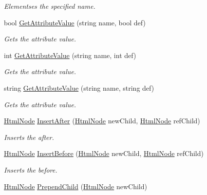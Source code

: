 \begin{DoxyCompactItemize}
\begin{DoxyCompactList}\small\item\em Elementses the specified name. \end{DoxyCompactList}\item 
bool \hyperlink{class_html_agility_pack_1_1_html_node_a7c92c891c52dc9e5439ab7aa03a455b0}{Get\+Attribute\+Value} (string name, bool def)
\begin{DoxyCompactList}\small\item\em Gets the attribute value. \end{DoxyCompactList}\item 
int \hyperlink{class_html_agility_pack_1_1_html_node_a867a87ed04bc299e6ebd9012ec32b1f0}{Get\+Attribute\+Value} (string name, int def)
\begin{DoxyCompactList}\small\item\em Gets the attribute value. \end{DoxyCompactList}\item 
string \hyperlink{class_html_agility_pack_1_1_html_node_aba043cb93effaa267479336fbc68d446}{Get\+Attribute\+Value} (string name, string def)
\begin{DoxyCompactList}\small\item\em Gets the attribute value. \end{DoxyCompactList}\item 
\hyperlink{class_html_agility_pack_1_1_html_node}{Html\+Node} \hyperlink{class_html_agility_pack_1_1_html_node_ac81201c1243724141548c7981a70fb56}{Insert\+After} (\hyperlink{class_html_agility_pack_1_1_html_node}{Html\+Node} new\+Child, \hyperlink{class_html_agility_pack_1_1_html_node}{Html\+Node} ref\+Child)
\begin{DoxyCompactList}\small\item\em Inserts the after. \end{DoxyCompactList}\item 
\hyperlink{class_html_agility_pack_1_1_html_node}{Html\+Node} \hyperlink{class_html_agility_pack_1_1_html_node_a7f42a331f6d29d079254604268e75f49}{Insert\+Before} (\hyperlink{class_html_agility_pack_1_1_html_node}{Html\+Node} new\+Child, \hyperlink{class_html_agility_pack_1_1_html_node}{Html\+Node} ref\+Child)
\begin{DoxyCompactList}\small\item\em Inserts the before. \end{DoxyCompactList}\item 
\hyperlink{class_html_agility_pack_1_1_html_node}{Html\+Node} \hyperlink{class_html_agility_pack_1_1_html_node_a9319d4e8401526a1c22e3cf68591a647}{Prepend\+Child} (\hyperlink{class_html_agility_pack_1_1_html_node}{Html\+Node} new\+Child)

\end{DoxyCompactItemize}
